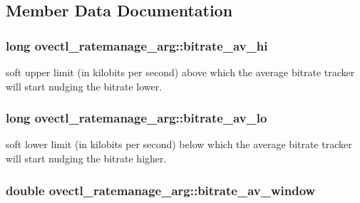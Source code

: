 \subsection{Member Data Documentation}
\hypertarget{structovectl__ratemanage__arg_ac1e81b5a2e705022ca895f494718ded7}{
\subsubsection[{bitrate\+\_\+av\+\_\+hi}]{\setlength{\rightskip}{0pt plus 5cm}long ovectl\+\_\+ratemanage\+\_\+arg\+::bitrate\+\_\+av\+\_\+hi}}\label{structovectl__ratemanage__arg_ac1e81b5a2e705022ca895f494718ded7}
soft upper limit (in kilobits per second) above which the average bitrate tracker will start nudging the bitrate lower. \hypertarget{structovectl__ratemanage__arg_ac241670a3a608f114acaf8f26fe4e913}{
\subsubsection[{bitrate\+\_\+av\+\_\+lo}]{\setlength{\rightskip}{0pt plus 5cm}long ovectl\+\_\+ratemanage\+\_\+arg\+::bitrate\+\_\+av\+\_\+lo}}\label{structovectl__ratemanage__arg_ac241670a3a608f114acaf8f26fe4e913}
soft lower limit (in kilobits per second) below which the average bitrate tracker will start nudging the bitrate higher. \hypertarget{structovectl__ratemanage__arg_a1232e7296ae5e52f52039bed2560c505}{
\subsubsection[{bitrate\+\_\+av\+\_\+window}]{\setlength{\rightskip}{0pt plus 5cm}double ovectl\+\_\+ratemanage\+\_\+arg\+::bitrate\+\_\+av\+\_\+window}}\label{structovectl__ratemanage__arg_a1232e7296ae5e52f52039bed2560c505}
